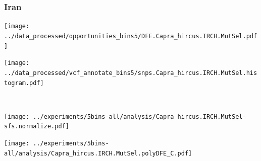 \subsubsection{Iran}

\begin{minipage}{0.49\linewidth}
    \texttt{[image: ../data\_processed/opportunities\_bins5/DFE.Capra\_hircus.IRCH.MutSel.pdf]}
\end{minipage}
\begin{minipage}{0.49\linewidth}
    \texttt{[image: ../data\_processed/vcf\_annotate\_bins5/snps.Capra\_hircus.IRCH.MutSel.histogram.pdf]}
\end{minipage}
\\
\begin{minipage}{0.49\linewidth}
    \texttt{[image: ../experiments/5bins-all/analysis/Capra\_hircus.IRCH.MutSel-sfs.normalize.pdf]}
\end{minipage}
\begin{minipage}{0.4\linewidth}
    \texttt{[image: ../experiments/5bins-all/analysis/Capra\_hircus.IRCH.MutSel.polyDFE\_C.pdf]}
\end{minipage}
